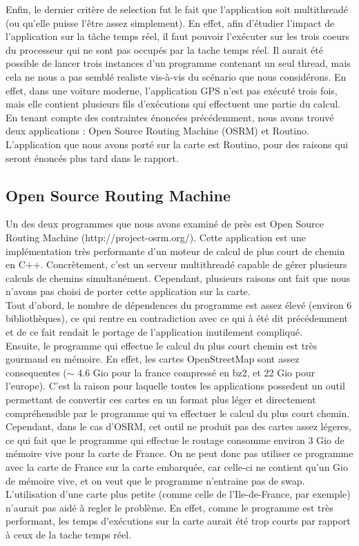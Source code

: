 Enfin, le dernier critère de selection fut le fait que l'application soit 
multithreadé (ou qu'elle puisse l'être assez simplement). En effet, afin 
d'étudier l'impact de l'application sur la tâche temps réel, il faut pouvoir 
l'exécuter sur les trois coeurs du processeur qui ne sont pas occupés par la
tache temps réel. Il aurait été possible de lancer trois instances d'un 
programme contenant un seul thread, mais cela ne nous a pas semblé realiste 
vis-à-vis du scénario que nous considérons. En effet, dans une voiture moderne, 
l'application GPS n'est pas exécuté trois fois, mais elle contient plusieurs 
fils d'exécutions qui effectuent une partie du calcul. \\

En tenant compte des contraintes énoncées précédemment, nous avons trouvé deux
applications : Open Source Routing Machine (OSRM) et Routino. L'application que
nous avons porté sur la carte est Routino, pour des raisons qui seront énoncés
plus tard dans le rapport.

\subsection{Open Source Routing Machine}

Un des deux programmes que nous avons examiné de près est Open Source Routing 
Machine (http://project-osrm.org/). Cette application est une implémentation 
très performante d'un moteur de calcul de plus court de chemin en C++. 
Concrètement, c'est un serveur multithreadé capable de gérer plusieurs calculs 
de chemins simultanément. Cependant, plusieurs raisons ont fait que nous 
n'avons pas choisi de porter cette application sur la carte. \\

Tout d'abord, le nombre de dépendences du programme est assez élevé (environ 
6 bibliothèques), ce qui rentre en contradiction avec ce qui à été dit 
précédemment et de ce fait rendait le portage de l'application inutilement
compliqué. \\

Ensuite, le programme qui effectue le calcul du plus court chemin est très 
gourmand en mémoire. En effet, les cartes OpenStreetMap sont assez consequentes 
($\sim$ 4.6 Gio pour la france compressé en bz2, et 22 Gio pour l'europe). C'est
 la raison pour laquelle toutes les applications possedent un outil permettant 
de convertir ces cartes en un format plus léger et directement compréhensible 
par le programme qui va effectuer le calcul du plus court chemin. Cependant, 
dans le cas d'OSRM, cet outil ne produit pas des cartes assez légeres, ce qui 
fait que le programme qui effectue le routage consomme environ 3 Gio de mémoire 
vive pour la carte de France. On ne peut donc pas utiliser ce programme avec la 
carte de France sur la carte embarquée, car celle-ci ne contient qu'un Gio de 
mémoire vive, et on veut que le programme n'entraine pas de swap. L'utilisation 
d'une carte plus petite (comme celle de l'Ile-de-France, par exemple) n'aurait 
pas aidé à regler le problème. En effet, comme le programme est très performant,
 les temps d'exécutions sur la carte aurait été trop courts par rapport à ceux 
de la tache temps réel. \\

